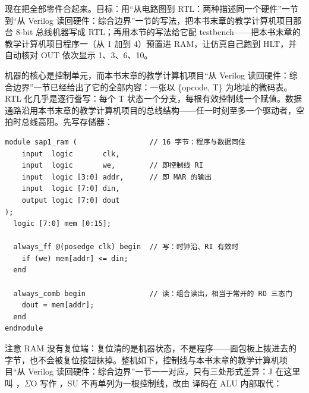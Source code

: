 现在把全部零件合起来。目标：用“从电路图到 RTL：两种描述同一个硬件”一节到“从 Verilog 读回硬件：综合边界”一节的写法，把本书末章的教学计算机项目那台 8-bit 总线机器写成 RTL；再用本节的写法给它配 testbench——把本书末章的教学计算机项目程序一（从 1 加到 4）预置进 RAM，让仿真自己跑到 HLT，并自动核对 OUT 依次显示 1、3、6、10。

机器的核心是控制单元，而本书末章的教学计算机项目“从 Verilog 读回硬件：综合边界”一节已经给出了它的全部内容：一张以 \{opcode, T\} 为地址的微码表。RTL 化几乎是逐行誊写：每个 T 状态一个分支，每根有效控制线一个赋值。数据通路沿用本书末章的教学计算机项目的总线结构——任一时刻至多一个驱动者，空拍时总线高阻。先写存储器：

\begin{lstlisting}
module sap1_ram (                 // 16 字节：程序与数据同住
    input  logic       clk,
    input  logic       we,        // 即控制线 RI
    input  logic [3:0] addr,      // 即 MAR 的输出
    input  logic [7:0] din,
    output logic [7:0] dout
);
  logic [7:0] mem [0:15];

  always_ff @(posedge clk) begin  // 写：时钟沿、RI 有效时
    if (we) mem[addr] <= din;
  end

  always_comb begin               // 读：组合读出，相当于常开的 RO 三态门
    dout = mem[addr];
  end
endmodule
\end{lstlisting}

注意 RAM 没有复位端：复位清的是机器状态，不是程序——面包板上拨进去的字节，也不会被复位按钮抹掉。整机如下，控制线与本书末章的教学计算机项目“从 Verilog 读回硬件：综合边界”一节一一对应，只有三处形式差异：J 在这里叫 ，$\Sigma$O 写作 ，SU 不再单列为一根控制线，改由  译码在 ALU 内部取代：

